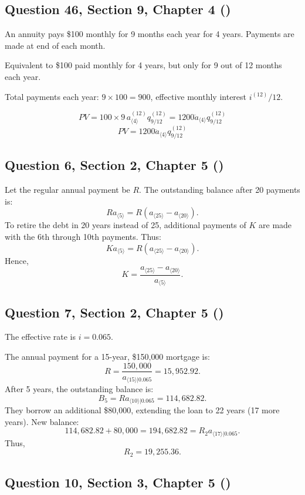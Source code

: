 \documentclass[12pt, a4paper]{article}
\newcommand{\angl}[1]{\langle #1 \rangle}
\begin{document}
\subsection*{Question 46, Section 9, Chapter 4  (\cite{toi3rd})}

An annuity pays \$100 monthly for 9 months each year for 4 years.  
Payments are made at end of each month.

Equivalent to \$100 paid monthly for 4 years, but only for 9 out of 12 months each year.

Total payments each year: \( 9 \times 100 = 900 \),  
effective monthly interest \( i^{(12)}/12 \).

\[
PV = 100 \times 9 \, a_{\angl{4}}^{(12)} q_{9/12}^{(12)} = 1200 \ddot{a}_{\angl{4}} q_{9/12}^{(12)}
\]
\[
\boxed{PV = 1200 \ddot{a}_{\angl{4}} q_{9/12}^{(12)}}
\]

\subsection*{Question 6, Section 2, Chapter 5  (\cite{toi3rd})}

Let the regular annual payment be \( R \).  
The outstanding balance after 20 payments is:
\[
R a_{\angl{5}} = R(a_{\angl{25}} - a_{\angl{20}}).
\]
To retire the debt in 20 years instead of 25, additional payments of \( K \) are made with the 6th through 10th payments.  
Thus:
\[
K a_{\angl{5}} = R(a_{\angl{25}} - a_{\angl{20}}).
\]
Hence,
\[
K = \frac{a_{\angl{25}} - a_{\angl{20}}}{a_{\angl{5}}}.
\]

\subsection*{Question 7, Section 2, Chapter 5  (\cite{toi3rd})}

The effective rate is \( i = 0.065 \).

The annual payment for a 15-year, \$150{,}000 mortgage is:
\[
R = \frac{150{,}000}{a_{\angl{15}|0.065}} = 15{,}952.92.
\]
After 5 years, the outstanding balance is:
\[
B_5 = R a_{\angl{10}|0.065} = 114{,}682.82.
\]
They borrow an additional \$80{,}000, extending the loan to 22 years (17 more years).  
New balance:
\[
114{,}682.82 + 80{,}000 = 194{,}682.82 = R_2 a_{\angl{17}|0.065}.
\]
Thus,
\[
R_2 = 19{,}255.36.
\]

\subsection*{Question 10, Section 3, Chapter 5  (\cite{toi3rd})}
\end{document}
